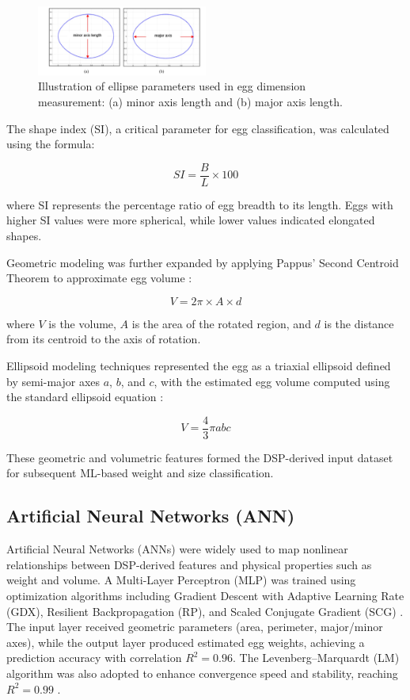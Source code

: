 \documentclass[conference]{IEEEtran}
\begin{document}
	\begin{figure}[h!]
		\centering
		\includegraphics[width=0.50\textwidth]{fig2.png}
		\caption{Illustration of ellipse parameters used in egg dimension measurement: (a) minor axis length and (b) major axis length.}
		\label{fig:ellipse_axes}
	\end{figure}
	
	The shape index (SI), a critical parameter for egg classification, was calculated using the formula:
	
	\[
	SI = \frac{B}{L} \times 100
	\]

	
	where SI represents the percentage ratio of egg breadth to its length. Eggs with higher SI values were more spherical, while lower values indicated elongated shapes.
	
	Geometric modeling was further expanded by applying Pappus’ Second Centroid Theorem to approximate egg volume \cite{soltani2015}:
	
	\[
	V = 2 \pi \times A \times d
	\]
	
	where \(V\) is the volume, \(A\) is the area of the rotated region, and \(d\) is the distance from its centroid to the axis of rotation.
	
	Ellipsoid modeling techniques represented the egg as a triaxial ellipsoid defined by semi-major axes \(a\), \(b\), and \(c\), with the estimated egg volume computed using the standard ellipsoid equation \cite{2018}:
	
	\[
	V = \frac{4}{3} \pi a b c
	\]
	
	These geometric and volumetric features formed the DSP-derived input dataset for subsequent ML-based weight and size classification.
	
	\subsection{Artificial Neural Networks (ANN)}
	
	Artificial Neural Networks (ANNs) were widely used to map nonlinear relationships between DSP-derived features and physical properties such as weight and volume. A Multi-Layer Perceptron (MLP) was trained using optimization algorithms including Gradient Descent with Adaptive Learning Rate (GDX), Resilient Backpropagation (RP), and Scaled Conjugate Gradient (SCG) \cite{asadi2010}. The input layer received geometric parameters (area, perimeter, major/minor axes), while the output layer produced estimated egg weights, achieving a prediction accuracy with correlation \(R^2 = 0.96\). The Levenberg–Marquardt (LM) algorithm was also adopted to enhance convergence speed and stability, reaching \(R^2 = 0.99\) \cite{soltani2015}.
	
\end{document}
